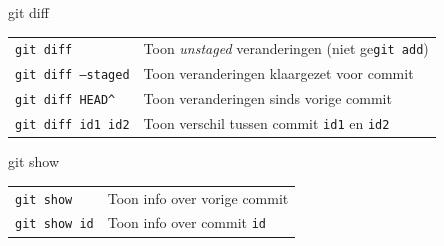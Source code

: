 \begin{frame}{git diff}
	\begin{tabularx}{\linewidth}{lX}
		\texttt{git diff}
			& Toon \textit{unstaged} veranderingen (niet ge\texttt{git add})\\
		\texttt{git diff --staged}
			& Toon veranderingen klaargezet voor commit\\
		\texttt{git diff HEAD\^}
			& Toon veranderingen sinds vorige commit\\
		\texttt{git diff id1 id2}
			& Toon verschil tussen commit \texttt{id1} en \texttt{id2}
	\end{tabularx}

	\medskip
\end{frame}

\begin{frame}{git show}
	\begin{tabular}{l l}
		\texttt{git show}
			& Toon info over vorige commit\\
		\texttt{git show id}
			& Toon info over commit \texttt{id}\\
	\end{tabular}
\end{frame}

